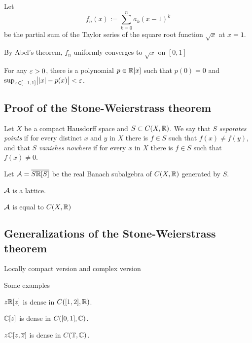 \documentclass{../note}
\begin{document}
\begin{prb}
Let
\[f_n(x):=\sum_{k=0}^n a_k(x-1)^k\]
be the partial sum of the Taylor series of the square root function $\sqrt x$ at $x=1$.
\begin{parts}
\item By Abel's theorem, $f_n$ uniformly converges to $\sqrt x$ on $[0,1]$
\item For any $\varepsilon>0$, there is a polynomial $p\in\mathbb{R}[x]$ such that $p(0)=0$ and $\sup_{x\in[-1,1]}\bigl||x|-p(x)\bigr|<\varepsilon$.
\end{parts}
\end{prb}


\subsection{Proof of the Stone-Weierstrass theorem}
\begin{prb}
Let $X$ be a compact Hausdorff space and $S\subset C(X,\mathbb{R})$.
We say that $S$ \emph{separates points} if for every distinct $x$ and $y$ in $X$ there is $f\in S$ such that $f(x)\ne f(y)$, and that $S$ \emph{vanishes nowhere} if for every $x$ in $X$ there is $f\in S$ such that $f(x)\ne0$.

Let $\mathcal{A}=\overline{S\mathbb{R}[S]}$ be the real Banach subalgebra of $C(X,\mathbb{R})$ generated by $S$.
\begin{parts}
\item $\mathcal{A}$ is a lattice.
\item $\mathcal{A}$ is equal to $C(X,\mathbb{R})$
\end{parts}
\end{prb}





\subsection{Generalizations of the Stone-Weierstrass theorem}

Locally compact version and complex version








\begin{prb}
Some examples
\begin{parts}
\item $z\mathbb{R}[z]$ is dense in $C([1,2],\mathbb{R})$.
\item $\mathbb{C}[z]$ is dense in $C([0,1],\mathbb{C})$.
\item $z\mathbb{C}[z,\overline z]$ is dense in $C(\mathbb{T},\mathbb{C})$.
\end{parts}
\end{prb}
\end{document}
